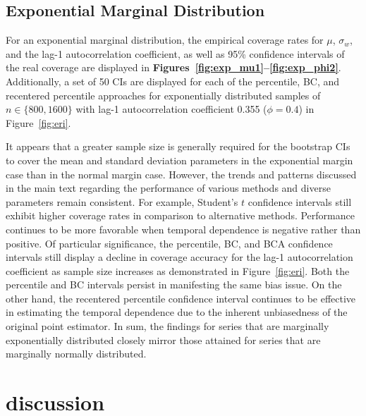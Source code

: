 \documentclass[10pt]{article}
\newcommand{\eds}[1]{\textcolor{red}{EDS: (#1)}}
\newcommand{\mc}[1]{\textcolor{orange}{MC: (#1)}}
\begin{document}
\subsection*{Exponential Marginal Distribution}
For an exponential marginal distribution, the empirical coverage rates for 
$\mu$, $\sigma_w$, %
and 
the lag-1 autocorrelation coefficient, %
as well as 95\%
confidence intervals of the real coverage are displayed in 
\textbf{Figures~\ref{fig:exp_mu1}--\ref{fig:exp_phi2}}. 
Additionally, a set of 50 CIs are displayed for each of the percentile, 
BC, and recentered percentile approaches for exponentially distributed
samples of $n \in \{800, 1600\}$ with lag-1 autocorrelation coefficient 0.355
($\phi = 0.4$) in Figure~\ref{fig:eri}.


It appears that a greater sample size is generally required for the bootstrap
CIs to cover the mean and standard deviation parameters in the exponential
margin case than in the normal margin case. However, the trends and patterns
discussed in the main text regarding the performance of various methods and
diverse parameters remain consistent. For example, Student's $t$ confidence
intervals still exhibit higher coverage rates in comparison to alternative
methods. Performance continues to be more favorable when temporal dependence is
negative rather than positive. Of particular significance, the 
percentile, BC,
and BCA confidence intervals still display a decline in coverage accuracy for
the lag-1 autocorrelation coefficient as sample size increases as demonstrated
in Figure~\ref{fig:eri}. Both the percentile and BC intervals persist in
manifesting the same bias issue. On the other hand, the recentered percentile
confidence interval continues to be effective in estimating the temporal 
dependence %
due to the
inherent unbiasedness of the original point estimator. In sum, the findings for
series that are marginally exponentially distributed closely mirror those
attained for series that are marginally normally distributed.
  
\section*{discussion}
\label{sec:disc}
\end{document}

